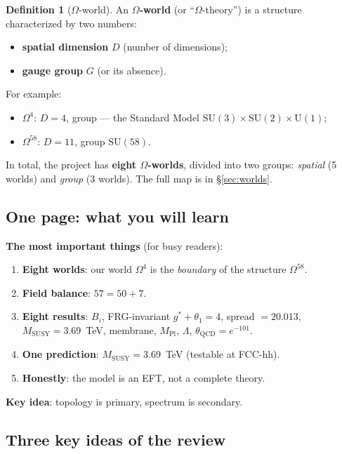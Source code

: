 \documentclass[11pt,a4paper]{article}
\newcommand{\SU}{\mathrm{SU}}
\newcommand{\Om}{\Omega^4}
\newcommand{\Omfi}{\Omega^{58}}
\theoremstyle{definition}
\newtheorem{definition}[theorem]{Definition}
\begin{document}
\begin{definition}[$\Omega$-world]
\label{def:omega-world}
An \textbf{$\Omega$-world} (or ``$\Omega$-theory'') is a structure 
characterized by two numbers:
\begin{itemize}
    \item \textbf{spatial dimension} $D$ 
          (number of dimensions);
    \item \textbf{gauge group} $G$ (or its absence).
\end{itemize}
For example:
\begin{itemize}
    \item $\Om$: $D = 4$, group — the Standard Model 
          $\SU(3) \times \SU(2) \times \mathrm{U}(1)$;
    \item $\Omfi$: $D = 11$, group $\SU(58)$.
\end{itemize}
In total, the project has \textbf{eight $\Omega$-worlds}, divided 
into two groups: \emph{spatial} (5 worlds) and 
\emph{group} (3 worlds). The full map is in §\ref{sec:worlds}.
\end{definition}

\subsection{One page: what you will learn}
\label{subsec:one-page}

\textbf{The most important things} (for busy readers):

\begin{enumerate}
    \item \textbf{Eight worlds}: our world $\Om$ is the \emph{boundary} 
          of the structure $\Omega^{58}$.
    \item \textbf{Field balance}: $57 = 50 + 7$.
    \item \textbf{Eight results}: $B_i$, FRG-invariant 
          $g^*+\theta_1 = 4$, spread $= 20.013$, 
          $M_{\text{SUSY}} = 3.69$~TeV, membrane, 
          $M_{\text{Pl}}$, $\Lambda$, $\theta_{\text{QCD}} = e^{-101}$.
    \item \textbf{One prediction}: $M_{\text{SUSY}} = 3.69$~TeV 
          (testable at FCC-hh).
    \item \textbf{Honestly}: the model is an EFT, not a complete theory.
\end{enumerate}

\medskip\noindent
\textbf{Key idea}: topology is primary, spectrum is secondary.

\subsection{Three key ideas of the review}
\end{document}

